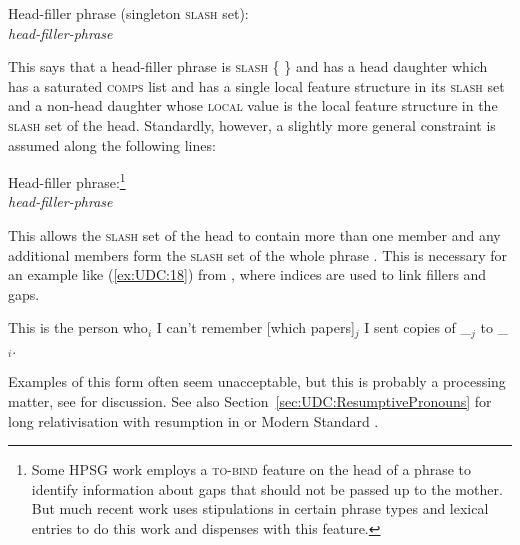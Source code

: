 \documentclass[output=paper
,notxmath 
 	        ,biblatex
                ,babelshorthands
                ,newtxmath
                ,draftmode
                ,colorlinks, citecolor=brown
]{langscibook}
\begin{document}
\ea
Head-filler phrase (singleton \textsc{slash} set):\\
\emph{head-filler-phrase} \impl\\
\z

\noindent
This says that a head-filler phrase is \textsc{slash} \{  \} and has a head
daughter which has a saturated \textsc{comps} list and has a single local feature structure in its
\textsc{slash} set and a non-head daughter whose \textsc{local} value is the local feature
structure in the \textsc{slash} set of the head. Standardly, however, a slightly
more general constraint is assumed along the following lines:

\eas
\label{fig:UDC:17}
Head-filler phrase:\footnote{Some HPSG work employs a \textsc{to-bind} feature
  on the head of a phrase to identify information about gaps that
  should not be passed up to the mother. But much recent work uses
  stipulations in certain phrase types and lexical entries to do this
  work and dispenses with this feature.

}\\
\emph{head-filler-phrase} \impl\\
\zs

\noindent
This allows the \textsc{slash} set of the head to contain more than one member
and any additional members form the \textsc{slash} set of the whole phrase . This
is necessary for an example like (\ref{ex:UDC:18}) from \citet[473]{Chaves:12}, where indices
are used to link fillers and gaps.

\ea
\label{ex:UDC:18}
This is the person who$_i$ I can't remember [which papers]$_j$ I sent copies of \_$_j$ to \_$_i$.
\z

\noindent
Examples of this form often seem unacceptable, but this is probably a
processing matter, see \citet[Section~3]{Chaves:12} for discussion.
See also Section~\ref{sec:UDC:ResumptivePronouns} for long
relativisation with resumption in  or Modern Standard .
\end{document}
